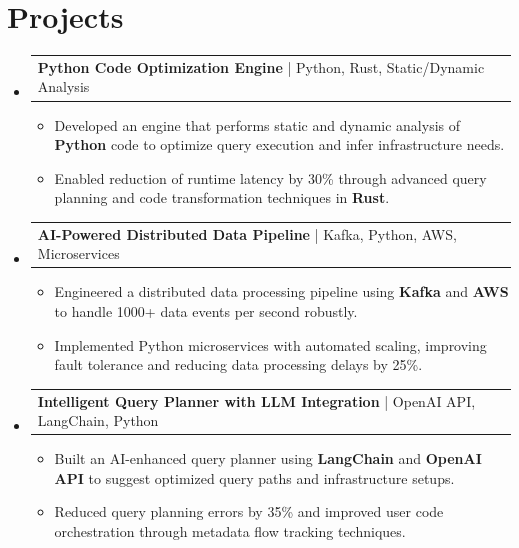 \documentclass[letterpaper,11pt]{article}
\makeatletter
\newcommand{\resumeItem}[1]{
  \item\footnotesize{
    {#1 \vspace{-2pt}}
  }
}
\newcommand{\resumeProjectHeading}[2]{
    \item
    \begin{tabular*}{1.001\textwidth}{l@{\extracolsep{\fill}}r}
      \small#1 & \textbf{\small #2}\\
    \end{tabular*}\vspace{-7pt}
}
\newcommand{\resumeSubHeadingListStart}{\begin{itemize}[leftmargin=0pt, label={}]}
\newcommand{\resumeSubHeadingListEnd}{\end{itemize}}
\newcommand{\resumeItemListStart}{\begin{itemize}[leftmargin=*]}
\newcommand{\resumeItemListEnd}{\end{itemize}\vspace{-5pt}}
\makeatother
\begin{document}
\section{Projects}
    \vspace{-5pt}
    \resumeSubHeadingListStart
          \resumeProjectHeading
              {\textbf{Python Code Optimization Engine} | Python, Rust, Static/Dynamic Analysis}{}
        \resumeItemListStart
            \resumeItem{Developed an engine that performs static and dynamic analysis of \textbf{Python} code to optimize query execution and infer infrastructure needs.}
            \resumeItem{Enabled reduction of runtime latency by 30\% through advanced query planning and code transformation techniques in \textbf{Rust}.}
        \resumeItemListEnd
        \vspace{-12pt}
    
    \resumeProjectHeading
        {\textbf{AI-Powered Distributed Data Pipeline} | Kafka, Python, AWS, Microservices}{}
        \resumeItemListStart
            \resumeItem{Engineered a distributed data processing pipeline using \textbf{Kafka} and \textbf{AWS} to handle 1000+ data events per second robustly.}
            \resumeItem{Implemented Python microservices with automated scaling, improving fault tolerance and reducing data processing delays by 25\%.}
        \resumeItemListEnd
          \vspace{-12pt}
      \resumeProjectHeading
          {\textbf{Intelligent Query Planner with LLM Integration} | OpenAI API, LangChain, Python}{}
          \resumeItemListStart
              \resumeItem{Built an AI-enhanced query planner using \textbf{LangChain} and \textbf{OpenAI API} to suggest optimized query paths and infrastructure setups.}
              \resumeItem{Reduced query planning errors by 35\% and improved user code orchestration through metadata flow tracking techniques.}
          \resumeItemListEnd 
    \resumeSubHeadingListEnd
\end{document}
